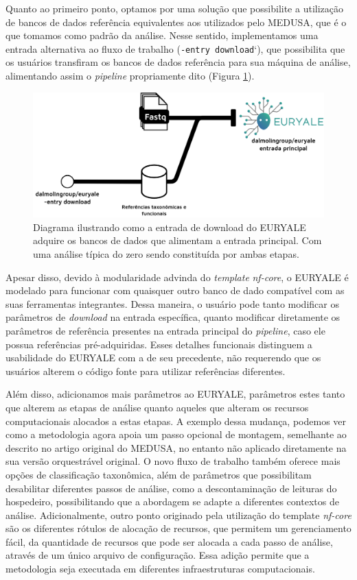 \documentclass[
	12pt,				%
	oneside,			%
	a4paper,			%
	chapter=TITLE,		%
	section=TITLE,		%
	english,			%
	brazil				%
	]{abntex2}
\begin{document}
Quanto ao primeiro ponto, optamos por uma solução que possibilite a utilização de bancos de dados referência equivalentes aos utilizados pelo MEDUSA, que é o que tomamos como padrão da análise. Nesse sentido, implementamos uma entrada alternativa ao fluxo de trabalho (\texttt{-entry\ download}`), que possibilita que os usuários transfiram os bancos de dados referência para sua máquina de análise, alimentando assim o \emph{pipeline} propriamente dito (Figura \ref{fig:entries}).
\begin{figure}[H]

{\centering \includegraphics[width=0.7\linewidth]{figure/euryale_entries.drawio} 

}

\caption{Diagrama ilustrando como a entrada de download do EURYALE adquire os bancos de dados que alimentam a entrada principal. Com uma análise típica do zero sendo constituída por ambas etapas.}\label{fig:entries}
\end{figure}
Apesar disso, devido à modularidade advinda do \emph{template} \emph{nf-core}, o EURYALE é modelado para funcionar com quaisquer outro banco de dado compatível com as suas ferramentas integrantes. Dessa maneira, o usuário pode tanto modificar os parâmetros de \emph{download} na entrada específica, quanto modificar diretamente os parâmetros de referência presentes na entrada principal do \emph{pipeline}, caso ele possua referências pré-adquiridas. Esses detalhes funcionais distinguem a usabilidade do EURYALE com a de seu precedente, não requerendo que os usuários alterem o código fonte para utilizar referências diferentes.

Além disso, adicionamos mais parâmetros ao EURYALE, parâmetros estes tanto que alterem as etapas de análise quanto aqueles que alteram os recursos computacionais alocados a estas etapas. A exemplo dessa mudança, podemos ver como a metodologia agora apoia um passo opcional de montagem, semelhante ao descrito no artigo original do MEDUSA, no entanto não aplicado diretamente na sua versão orquestrável original. O novo fluxo de trabalho também oferece mais opções de classificação taxonômica, além de parâmetros que possibilitam desabilitar diferentes passos de análise, como a descontaminação de leituras do hospedeiro, possibilitando que a abordagem se adapte a diferentes contextos de análise. Adicionalmente, outro ponto originado pela utilização do template \emph{nf-core} são os diferentes rótulos de alocação de recursos, que permitem um gerenciamento fácil, da quantidade de recursos que pode ser alocada a cada passo de análise, através de um único arquivo de configuração. Essa adição permite que a metodologia seja executada em diferentes infraestruturas computacionais.
\end{document}

